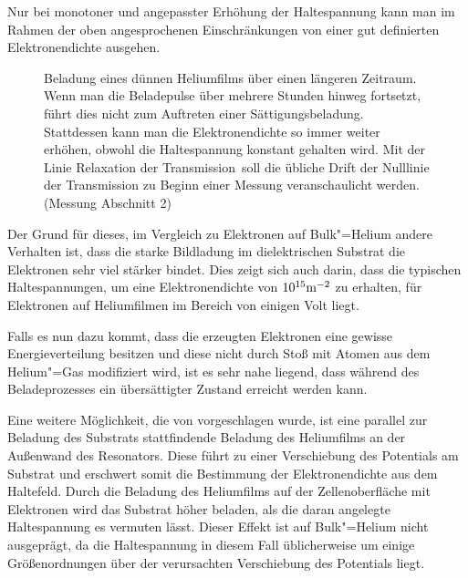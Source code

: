 Nur bei monotoner und angepasster Erhöhung der Haltespannung kann man im Rahmen der oben angesprochenen Einschränkungen von einer gut definierten Elektronendichte ausgehen.

\begin{figure}[h!tb]
    \hfill%
    \begin{minipage}[b]{\textwidth-\midwidth-\tabcolsep}
        \caption[Übersättigte Beladung eines dünnen Heliumfilms]{Beladung eines dünnen Heliumfilms über einen längeren Zeitraum. Wenn man die Beladepulse über mehrere Stunden hinweg fortsetzt, führt dies nicht zum Auftreten einer Sättigungsbeladung. Stattdessen kann man die Elektronendichte so immer weiter erhöhen, obwohl die Haltespannung konstant gehalten wird. Mit der Linie \glqq Relaxation der Transmission\grqq\ soll die übliche Drift der Nulllinie der Transmission zu Beginn einer Messung veranschaulicht werden. (Messung  Abschnitt 2)}
        \label{fig:longcharge}
    \end{minipage}
\end{figure}

Der Grund für dieses, im Vergleich zu Elektronen auf Bulk"=Helium andere Verhalten ist, dass die starke Bildladung im dielektrischen Substrat die Elektronen sehr viel stärker bindet. Dies zeigt sich auch darin, dass die typischen Haltespannungen, um eine Elektronendichte von $\unit{10^{15}}{\Em}$ zu erhalten, für Elektronen auf Heliumfilmen im Bereich von einigen Volt liegt.

Falls es nun dazu kommt, dass die erzeugten Elektronen eine gewisse Energieverteilung besitzen und diese nicht durch Stoß mit Atomen aus dem Helium"=Gas modifiziert wird, ist es sehr nahe liegend, dass während des Beladeprozesses ein übersättigter Zustand erreicht werden kann. 

Eine weitere Möglichkeit, die von  \cite{Shi99} vorgeschlagen wurde, ist eine parallel zur Beladung des Substrats stattfindende Beladung des Heliumfilms an der Außenwand des Resonators. Diese führt zu einer Verschiebung des Potentials am Substrat und erschwert somit die Bestimmung der Elektronendichte aus dem Haltefeld. Durch die Beladung des Heliumfilms auf der Zellenoberfläche mit Elektronen wird das Substrat höher beladen, als die daran angelegte Haltespannung es vermuten lässt. Dieser Effekt ist auf Bulk"=Helium nicht ausgeprägt, da die Haltespannung in diesem Fall üblicherweise um einige Größenordnungen über der verursachten Verschiebung des Potentials liegt.

